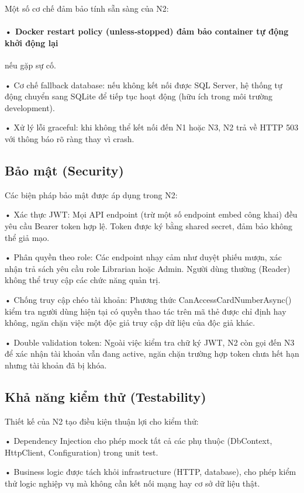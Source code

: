 Một số cơ chế đảm bảo tính sẵn sàng của N2:

\paragraph{• Docker restart policy (unless‐stopped) đảm bảo container tự động khởi động lại}

nếu gặp sự cố.

• Cơ chế fallback database: nếu không kết nối được SQL Server, hệ thống tự động chuyển sang SQLite để tiếp tục hoạt động (hữu ích trong môi trường development).

• Xử lý lỗi graceful: khi không thể kết nối đến N1 hoặc N3, N2 trả về HTTP 503 với thông báo rõ ràng thay vì crash.

\subsection{Bảo mật (Security)}

Các biện pháp bảo mật được áp dụng trong N2:

• Xác thực JWT: Mọi API endpoint (trừ một số endpoint embed công khai) đều yêu cầu Bearer token hợp lệ. Token được ký bằng shared secret, đảm bảo không thể giả mạo.

• Phân quyền theo role: Các endpoint nhạy cảm như duyệt phiếu mượn, xác nhận trả sách yêu cầu role Librarian hoặc Admin. Người dùng thường (Reader) không thể truy cập các chức năng quản trị.

• Chống truy cập chéo tài khoản: Phương thức CanAccessCardNumberAsync() kiểm tra người dùng hiện tại có quyền thao tác trên mã thẻ được chỉ định hay không, ngăn chặn việc một độc giả truy cập dữ liệu của độc giả khác.

• Double validation token: Ngoài việc kiểm tra chữ ký JWT, N2 còn gọi đến N3 để xác nhận tài khoản vẫn đang active, ngăn chặn trường hợp token chưa hết hạn nhưng tài khoản đã bị khóa.

\subsection{Khả năng kiểm thử (Testability)}

Thiết kế của N2 tạo điều kiện thuận lợi cho kiểm thử:

• Dependency Injection cho phép mock tất cả các phụ thuộc (DbContext, HttpClient, Configuration) trong unit test.

• Business logic được tách khỏi infrastructure (HTTP, database), cho phép kiểm thử logic nghiệp vụ mà không cần kết nối mạng hay cơ sở dữ liệu thật.

